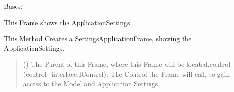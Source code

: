 \documentclass[letterpaper,10pt,english]{sphinxmanual}
\begin{document}
\begin{fulllineitems}
\label{\detokenize{apidoc/src.osm_configurator.view.utilityframes:src.osm_configurator.view.utilityframes.settings_application_frame.SettingsApplicationFrame}}
\pysigstartsignatures
{}
\pysigstopsignatures
\sphinxAtStartPar
Bases: 

\sphinxAtStartPar
This Frame shows the Application\sphinxhyphen{}Settings.

\begin{fulllineitems}
\label{\detokenize{apidoc/src.osm_configurator.view.utilityframes:src.osm_configurator.view.utilityframes.settings_application_frame.SettingsApplicationFrame.__init__}}
\pysigstartsignatures
{}
\pysigstopsignatures
\sphinxAtStartPar
This Method Creates a SettingsApplicationFrame, showing the Application\sphinxhyphen{}Settings.
\begin{quote}\begin{description}
\sphinxAtStartPar
{} ({\hyperref[\detokenize{apidoc/src.osm_configurator.view.toplevelframes:src.osm_configurator.view.toplevelframes.settings_frame.SettingsFrame}]{}}) \textendash{} The Parent of this Frame, where this Frame will be located.control (control\_interface.IControl): The Control the Frame will call, to gain access to the Model and Application Settings.

\end{description}\end{quote}

\end{fulllineitems}


\end{fulllineitems}
\end{document}
